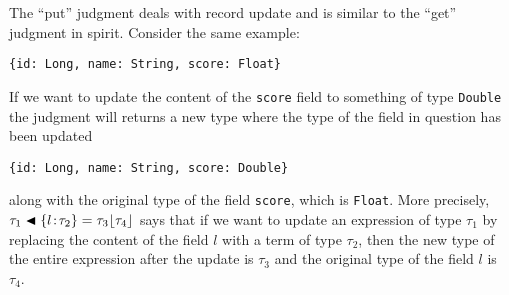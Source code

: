 The ``put'' judgment deals with record update and is similar to the ``get''
judgment in spirit. Consider the same example:
\begin{lstlisting}
{id: Long, name: String, score: Float}
\end{lstlisting}
If we want to update the content of the \lstinline$score$ field to something of
type \lstinline$Double$ the judgment will returns a new type where the type of
the field in question has been updated
\begin{lstlisting}
{id: Long, name: String, score: Double}
\end{lstlisting}
along with the original type of the field \lstinline$score$, which is
\lstinline$Float$. More precisely,
$\tau_1 \blacktriangleleft \{ l \!:\! \tau_2 \} = \tau_3 \lfloor \tau_4 \rfloor$ says that if we want to update
an expression of type $\tau_1$ by replacing the content of the field $l$ with a
term of type $\tau_2$, then the new type of the entire expression after the
update is $\tau_3$ and the original type of the field $l$ is $\tau_4$.



